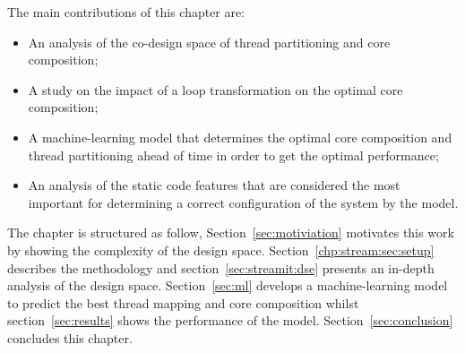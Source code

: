The main contributions of this chapter are:
\vspace{-1em}
\begin{itemize}
\item An analysis of the co-design space of thread partitioning and core composition;
\vspace{-1em}
\item A study on the impact of a loop transformation on the optimal core composition;
\vspace{-2em}
\item A machine-learning model that determines the optimal core composition and thread partitioning ahead of time in order to get the optimal performance;
\vspace{-1em}
\item An analysis of the static code features that are considered the most important for determining a correct configuration of the system by the model.
\end{itemize}


The chapter is structured as follow,
Section~\ref{sec:motiviation} motivates this work by showing the complexity of the design space.
Section~\ref{chp:stream:sec:setup} describes the methodology and section~\ref{sec:streamit:dse} presents an in-depth analysis of the design space.
Section~\ref{sec:ml} develops a machine-learning model to predict the best thread mapping and core composition whilst section~\ref{sec:results} shows the performance of the model.
Section~\ref{sec:conclusion} concludes this chapter.



